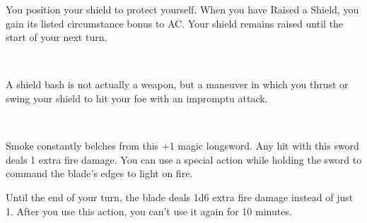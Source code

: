 \documentclass[paper=63mm:88mm, DIV=15, fontsize=8pt]{scrartcl}
\begin{document}
You position your shield to protect yourself. When you have Raised a Shield, you gain its listed circumstance bonus to AC. Your shield remains raised until the start of your next turn.


\\

A shield bash is not actually a weapon, but a maneuver in which you thrust or swing your shield to hit your foe with an impromptu attack.


\\

Smoke constantly belches from this +1 magic longsword. Any hit with this sword deals 1 extra fire damage. You can use a special action while holding the sword to command the blade's edges to light on fire.



Until the end of your turn, the blade deals 1d6 extra fire damage instead of just 1. After you use this action, you can't use it again for 10 minutes.
\end{document}
